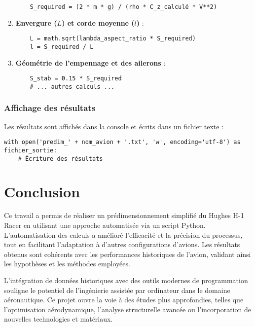 \documentclass[12pt,a4paper]{article}
\begin{document}
\begin{enumerate}[label=\arabic*.]
    \begin{verbatim}
    S_required = (2 * m * g) / (rho * C_z_calculé * V**2)
    \end{verbatim}

    \item \textbf{Envergure ($L$) et corde moyenne ($l$)} :

    \begin{verbatim}
    L = math.sqrt(lambda_aspect_ratio * S_required)
    l = S_required / L
    \end{verbatim}

    \item \textbf{Géométrie de l'empennage et des ailerons} :

    \begin{verbatim}
    S_stab = 0.15 * S_required
    # ... autres calculs ...
    \end{verbatim}
\end{enumerate}

\subsubsection{Affichage des résultats}

Les résultats sont affichés dans la console et écrits dans un fichier texte :

\begin{verbatim}
with open('predim_' + nom_avion + '.txt', 'w', encoding='utf-8') as fichier_sortie:
    # Écriture des résultats
\end{verbatim}

\section{Conclusion}

Ce travail a permis de réaliser un prédimensionnement simplifié du Hughes H-1 Racer en utilisant une approche automatisée via un script Python. L'automatisation des calculs a amélioré l'efficacité et la précision du processus, tout en facilitant l'adaptation à d'autres configurations d'avions. Les résultats obtenus sont cohérents avec les performances historiques de l'avion, validant ainsi les hypothèses et les méthodes employées.

L'intégration de données historiques avec des outils modernes de programmation souligne le potentiel de l'ingénierie assistée par ordinateur dans le domaine aéronautique. Ce projet ouvre la voie à des études plus approfondies, telles que l'optimisation aérodynamique, l'analyse structurelle avancée ou l'incorporation de nouvelles technologies et matériaux.
\end{document}
